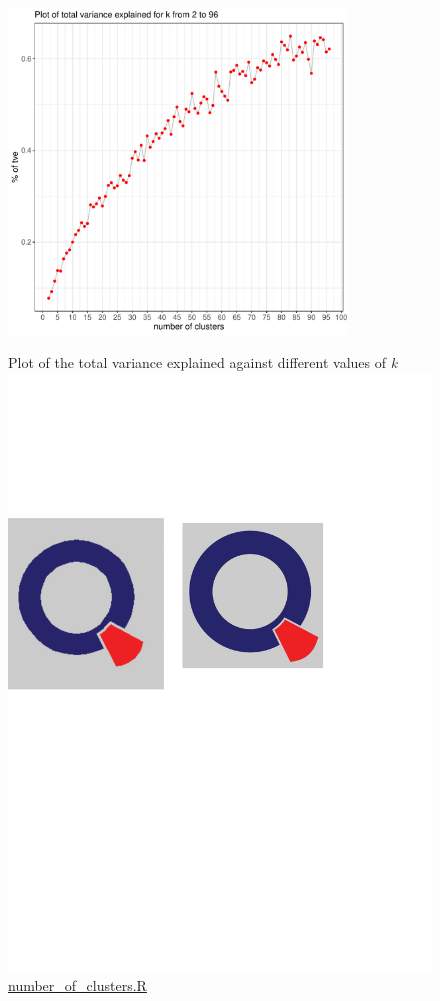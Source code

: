 \begin{figure}[H]
\begin{center}
\includegraphics[width=0.8\textwidth, keepaspectratio]{numclusters.pdf} \\
\caption{Plot of the total variance explained against different values of \textit{k} \protect\includegraphics[scale=0.05]{qletlogo.pdf} {\href{https://github.com/silvia-ventoruzzo/SPL-WISE-2018/blob/master/Helpers/number_of_clusters.R}{number\_of\_clusters.R}}}
\label{figure:numclusterplot}
\end{center}
\end{figure}

